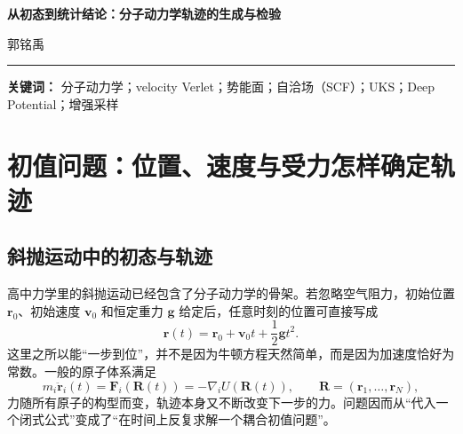 \documentclass[UTF8,10pt,a4paper,fontset=none]{ctexart}
\begin{document}
\color{black}
\raggedbottom
\begin{flushleft}
  {\bfseries\fontsize{17}{21}\selectfont 从初态到统计结论：分子动力学轨迹的生成与检验}\par
  \vspace{5pt}
  { 郭铭禹}\par
\end{flushleft}
\vspace{2pt}
\hrule
\vspace{6pt}

\begin{abstract}
分子动力学从给定位置、速度和受力出发，通过离散时间推进得到多体轨迹。轨迹的可信度同时取决于三个相互衔接的问题：积分器能否在长时间传播中保留哈密顿（Hamilton）动力学的几何结构，势能模型能否给出可靠且连续的能量与力，以及有限而相关的轨迹能否支持统计结论。斜抛运动和谐振子分别提供闭式基准与失稳反例，由此可辨认显式 Euler 的相空间膨胀以及速度 Verlet（velocity Verlet）的对称、辛和时间可逆结构。势能来源决定每一步的主要成本：经验势把物理假设写入解析函数，从头算分子动力学（ab initio molecular dynamics, AIMD）在每个离子步内迭代电子密度，深度势（Deep Potential）以局域环境和原子能分解近似电子结构势能面。系综控制、自相关和增强采样进一步决定轨迹访问哪些状态，以及其中包含多少独立信息。积分误差、势能面误差、系综偏差和统计误差需要分层判断；稳定的能量曲线本身不足以说明轨迹能够支持所报告的物理结论。
\end{abstract}

\noindent\textbf{关键词：} 分子动力学；velocity Verlet；势能面；自洽场（SCF）；UKS；Deep Potential；增强采样

\section{初值问题：位置、速度与受力怎样确定轨迹}

\subsection{斜抛运动中的初态与轨迹}

高中力学里的斜抛运动已经包含了分子动力学的骨架。若忽略空气阻力，初始位置 $\bm r_0$、初始速度 $\bm v_0$ 和恒定重力 $\bm g$ 给定后，任意时刻的位置可直接写成
\begin{equation}
  \bm r(t)=\bm r_0+\bm v_0t+\frac12\bm g t^2.
\end{equation}
这里之所以能“一步到位”，并不是因为牛顿方程天然简单，而是因为加速度恰好为常数。一般的原子体系满足
\begin{equation}
  m_i\ddot{\bm r}_i(t)=\bm F_i(\bm R(t))=-\nabla_i U(\bm R(t)),
  \qquad \bm R=(\bm r_1,\ldots,\bm r_N),
  \label{eq:newton}
\end{equation}
力随所有原子的构型而变，轨迹本身又不断改变下一步的力。问题因而从“代入一个闭式公式”变成了“在时间上反复求解一个耦合初值问题”。
\end{document}

